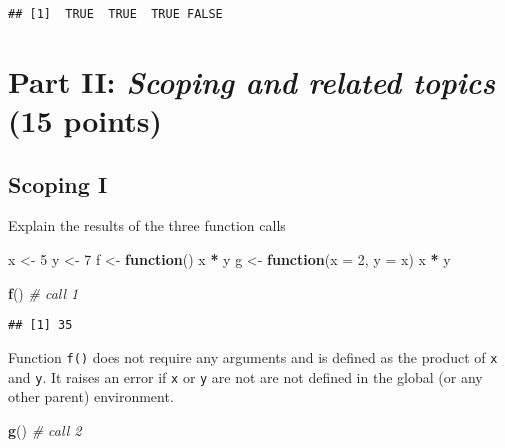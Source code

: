 \documentclass[12,]{article}
\newenvironment{Shaded}{\begin{snugshade}}{\end{snugshade}}
\newcommand{\KeywordTok}[1]{\textcolor[rgb]{0.13,0.29,0.53}{\textbf{#1}}}
\newcommand{\DataTypeTok}[1]{\textcolor[rgb]{0.13,0.29,0.53}{#1}}
\newcommand{\DecValTok}[1]{\textcolor[rgb]{0.00,0.00,0.81}{#1}}
\newcommand{\StringTok}[1]{\textcolor[rgb]{0.31,0.60,0.02}{#1}}
\newcommand{\CommentTok}[1]{\textcolor[rgb]{0.56,0.35,0.01}{\textit{#1}}}
\newcommand{\ControlFlowTok}[1]{\textcolor[rgb]{0.13,0.29,0.53}{\textbf{#1}}}
\newcommand{\OperatorTok}[1]{\textcolor[rgb]{0.81,0.36,0.00}{\textbf{#1}}}
\newcommand{\NormalTok}[1]{#1}
\begin{document}
\begin{verbatim}
## [1]  TRUE  TRUE  TRUE FALSE
\end{verbatim}

\section{\texorpdfstring{Part II: \emph{Scoping and related topics } (15
points)}{Part II: Scoping and related topics  (15 points)}}\label{part-ii-scoping-and-related-topics-15-points}

\subsection*{Scoping I}\label{scoping-i}

Explain the results of the three function calls

\begin{Shaded}
\begin{Highlighting}[]
\NormalTok{x <-}\StringTok{ }\DecValTok{5}
\NormalTok{y <-}\StringTok{ }\DecValTok{7}
\NormalTok{f <-}\StringTok{ }\ControlFlowTok{function}\NormalTok{() x }\OperatorTok{*}\StringTok{ }\NormalTok{y}
\NormalTok{g <-}\StringTok{ }\ControlFlowTok{function}\NormalTok{(}\DataTypeTok{x =} \DecValTok{2}\NormalTok{, }\DataTypeTok{y =}\NormalTok{ x) x }\OperatorTok{*}\StringTok{ }\NormalTok{y}
\end{Highlighting}
\end{Shaded}

\begin{Shaded}
\begin{Highlighting}[]
\KeywordTok{f}\NormalTok{()     }\CommentTok{# call 1}
\end{Highlighting}
\end{Shaded}

\begin{verbatim}
## [1] 35
\end{verbatim}

Function \texttt{f()} does not require any arguments and is defined as
the product of \texttt{x} and \texttt{y}. It raises an error if
\texttt{x} or \texttt{y} are not are not defined in the global (or any
other parent) environment.

\begin{Shaded}
\begin{Highlighting}[]
\KeywordTok{g}\NormalTok{()     }\CommentTok{# call 2}
\end{Highlighting}
\end{Shaded}
\end{document}
